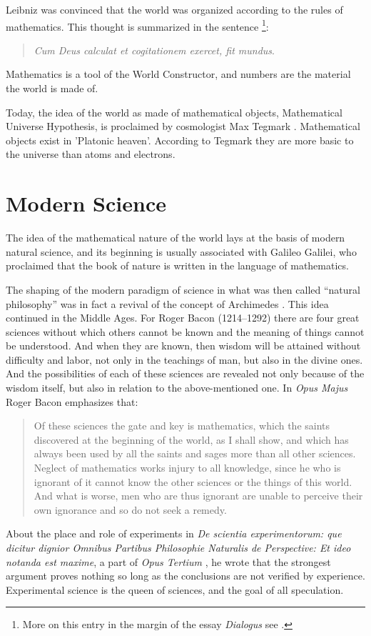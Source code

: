 \documentclass[pdftex,12pt]{article}
\begin{document}
Leibniz was convinced that the world was organized according to the rules of mathematics. This thought is summarized in the sentence \parencite*[p.191] {Leibniz1677}\footnote{More on this entry in the margin of the essay \emph{Dialogus} \parencite{Leibniz1677} see \parencite{Kopania2018}.}: \begin{quote} \small \emph{Cum Deus calculat et cogitationem exercet, fit mundus}. \end{quote} Mathematics is a tool of the World Constructor, and numbers are the material the world is made of.


Today, the idea of the world as made of mathematical objects, Mathematical Universe Hypothesis, is proclaimed by cosmologist Max Tegmark \parencite*{Tegmark2008,Tegmark2014}. Mathematical objects exist in 'Platonic heaven'. According to Tegmark they are more basic to the universe than atoms and electrons.


\section{Modern Science} 

The idea of the mathematical nature of the world lays at the basis of modern natural science, and its beginning is usually associated with Galileo Galilei, who proclaimed that the book of nature is written in the language of mathematics.

The shaping of the modern paradigm of science in what was then called ``natural philosophy'' was in fact a revival of the concept of Archimedes \parencite[pp.71, 77] {Heller2013}. This idea continued in the Middle Ages. For Roger Bacon (1214--1292) there are four great sciences without which others cannot be known and the meaning of things cannot be understood. And when they are known, then wisdom will be attained without difficulty and labor, not only in the teachings of man, but also in the divine ones. And the possibilities of each of these sciences  are revealed not only because of the wisdom itself, but also in relation to the above-mentioned one. In  \emph{Opus Majus} \parencite*[Pars Quarta, Distinctio Prima, Capitulum I]{Bacon2010a} Roger Bacon emphasizes that: \begin{quote} \small Of these sciences the gate and key is mathematics, which the saints discovered at the beginning of the world, as I shall show, and which has always been used by all the saints and sages more than all other sciences. Neglect of mathematics works injury to all knowledge, since he who is ignorant of it cannot know the other sciences or the things of this world. And what is worse, men who are thus ignorant are unable to perceive their own ignorance and so do not seek a remedy. \end{quote} About the place and role of experiments in \emph{De scientia experimentorum: que dicitur dignior Omnibus Partibus Philosophie Naturalis de Perspective: Et ideo notanda est maxime}, a part of \emph{Opus Tertium} \parencite*{Bacon1912}, he wrote that the strongest argument proves nothing so long as the conclusions are not verified by experience. Experimental science is the queen of sciences, and the goal of all speculation.
\end{document}
